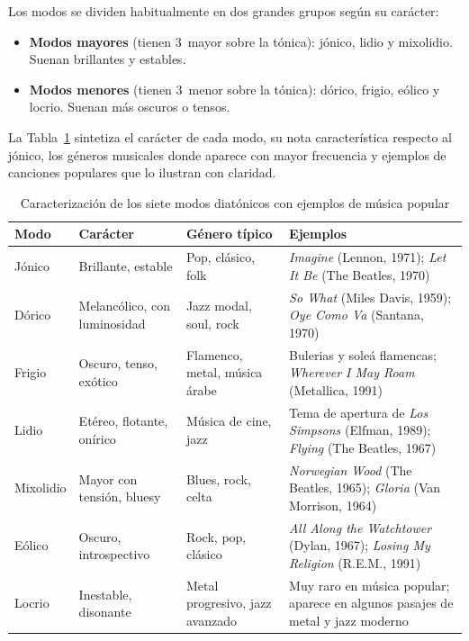 \documentclass[%
    school=etsisi,%
    type=pfg,%
    degree=61CD,%
]{upm-report}
\begin{document}
Los modos se dividen habitualmente en dos grandes grupos seg\'un su car\'acter:

\begin{itemize}
    \item \textbf{Modos mayores} (tienen 3\textordfeminine\ mayor sobre la t\'onica): j\'onico, lidio y mixolidio. Suenan brillantes y estables.
    \item \textbf{Modos menores} (tienen 3\textordfeminine\ menor sobre la t\'onica): d\'orico, frigio, e\'olico y locrio. Suenan m\'as oscuros o tensos.
\end{itemize}

La Tabla~\ref{tab:modos-ejemplos} sintetiza el car\'acter de cada modo, su nota caracter\'istica respecto al jónico, los géneros musicales donde aparece con mayor frecuencia y ejemplos de canciones populares que lo ilustran con claridad.

\begin{table}[htbp]
    \centering
    \caption{Caracterización de los siete modos diatónicos con ejemplos de música popular}
    \label{tab:modos-ejemplos}
    \small
    \begin{tabular}{llp{2.6cm}p{5.2cm}}
        \toprule
        \textbf{Modo} & \textbf{Car\'acter} & \textbf{G\'enero t\'ipico} & \textbf{Ejemplos} \\
        \midrule
        J\'onico
            & Brillante, estable
            & Pop, cl\'asico, folk
            & \textit{Imagine} (Lennon, 1971); \textit{Let It Be} (The Beatles, 1970) \\
        \addlinespace
        D\'orico
            & Melanc\'olico, con luminosidad
            & Jazz modal, soul, rock
            & \textit{So What} (Miles Davis, 1959); \textit{Oye Como Va} (Santana, 1970) \\
        \addlinespace
        Frigio
            & Oscuro, tenso, exótico
            & Flamenco, metal, m\'usica \'arabe
            & Bulerias y soleá flamencas; \textit{Wherever I May Roam} (Metallica, 1991) \\
        \addlinespace
        Lidio
            & Et\'ereo, flotante, onírico
            & M\'usica de cine, jazz
            & Tema de apertura de \textit{Los Simpsons} (Elfman, 1989); \textit{Flying} (The Beatles, 1967) \\
        \addlinespace
        Mixolidio
            & Mayor con tensión, bluesy
            & Blues, rock, celta
            & \textit{Norwegian Wood} (The Beatles, 1965); \textit{Gloria} (Van Morrison, 1964) \\
        \addlinespace
        E\'olico
            & Oscuro, introspectivo
            & Rock, pop, cl\'asico
            & \textit{All Along the Watchtower} (Dylan, 1967); \textit{Losing My Religion} (R.E.M., 1991) \\
        \addlinespace
        Locrio
            & Inestable, disonante
            & Metal progresivo, jazz avanzado
            & Muy raro en m\'usica popular; aparece en algunos pasajes de metal y jazz moderno \\
        \bottomrule
    \end{tabular}
\end{table}
\end{document}

